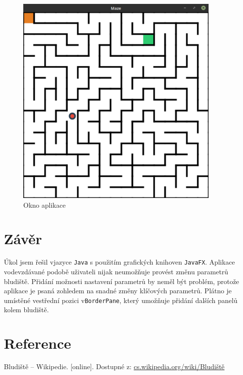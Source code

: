 \documentclass[12pt]{scrartcl}
\begin{document}
\begin{figure}[!ht]
	\centering
	\includegraphics[width=0.9\textwidth,natwidth=1,natheight=1]{app_gui.pdf}
	\caption{Okno aplikace}
\end{figure}	

\newpage
\section{Závěr}
\paragraph{}
Úkol jsem řešil v\nobreakspace jazyce \texttt{Java} s použitím grafických knihoven \texttt{JavaFX}.
Aplikace v\nobreakspace odevzdávané podobě uživateli nijak neumožňuje provést změnu parametrů bludiště. Přidání možnosti nastavení parametrů by neměl být problém, protože aplikace je psaná z\nobreakspace ohledem na snadné změny klíčových parametrů. Plátno je umístěné ve\nobreakspace střední pozici v\nobreakspace \texttt{BorderPane}, který umožňuje přidání dalších panelů kolem bludiště.

\section{Reference}

Bludiště – Wikipedie. [online]. Dostupné z: \href{https://cs.wikipedia.org/wiki/Bludiště}{cs.wikipedia.org/wiki/Bludiště}
\end{document}
